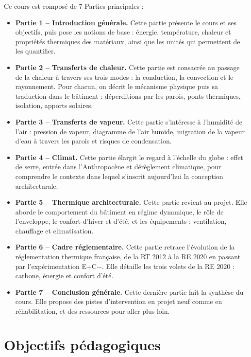 \documentclass[11pt,a4paper]{book}
\begin{document}
Ce cours est composé de 7 Parties principales :
\begin{itemize}
  \item \textbf{Partie 1 -- Introduction générale.} Cette partie présente le cours et ses objectifs, puis pose les notions de base : énergie, température, chaleur et propriétés thermiques des matériaux, ainsi que les unités qui permettent de les quantifier.

  \item \textbf{Partie 2 -- Transferts de chaleur.} Cette partie est consacrée au passage de la chaleur à travers ses trois modes : la conduction, la convection et le rayonnement. Pour chacun, on décrit le mécanisme physique puis sa traduction dans le bâtiment : déperditions par les parois, ponts thermiques, isolation, apports solaires.

  \item \textbf{Partie 3 -- Transferts de vapeur.} Cette partie s'intéresse à l'humidité de l'air : pression de vapeur, diagramme de l'air humide, migration de la vapeur d'eau à travers les parois et risques de condensation.

  \item \textbf{Partie 4 -- Climat.} Cette partie élargit le regard à l'échelle du globe : effet de serre, entrée dans l'Anthropocène et dérèglement climatique, pour comprendre le contexte dans lequel s'inscrit aujourd'hui la conception architecturale.

  \item \textbf{Partie 5 -- Thermique architecturale.} Cette partie revient au projet. Elle aborde le comportement du bâtiment en régime dynamique, le rôle de l'enveloppe, le confort d'hiver et d'été, et les équipements : ventilation, chauffage et climatisation.

  \item \textbf{Partie 6 -- Cadre réglementaire.} Cette partie retrace l'évolution de la réglementation thermique française, de la RT 2012 à la RE 2020 en passant par l'expérimentation E+C$-$. Elle détaille les trois volets de la RE 2020 : carbone, énergie et confort d'été.

  \item \textbf{Partie 7 -- Conclusion générale.} Cette dernière partie fait la synthèse du cours. Elle propose des pistes d'intervention en projet neuf comme en réhabilitation, et des ressources pour aller plus loin.
\end{itemize}

\section{Objectifs pédagogiques}
\end{document}
